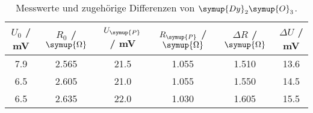 \begin{table}[!htp]
\centering
\caption{Messwerte und zugehörige Differenzen von $\symup{Dy}_2\symup{O}_3$.}
\label{tab:Dy2O3}
\begin{tabular}{c c c c c c}
\toprule
{$U_0$ / mV} & {$R_0$ / $\symup{\Omega}$} & {$U_{\symup{P}}$ / mV} & {$R_{\symup{P}}$ / $\symup{\Omega}$} & {$\Delta R$ / $\symup{\Omega}$} & {$\Delta U$ / mV} \\
\midrule
7.9 & 2.565 & 21.5 & 1.055 & 1.510 & 13.6 \\
6.5 & 2.605 & 21.0 & 1.055 & 1.550 & 14.5 \\
6.5 & 2.635 & 22.0 & 1.030 & 1.605 & 15.5 \\
\bottomrule
\end{tabular}
\end{table}